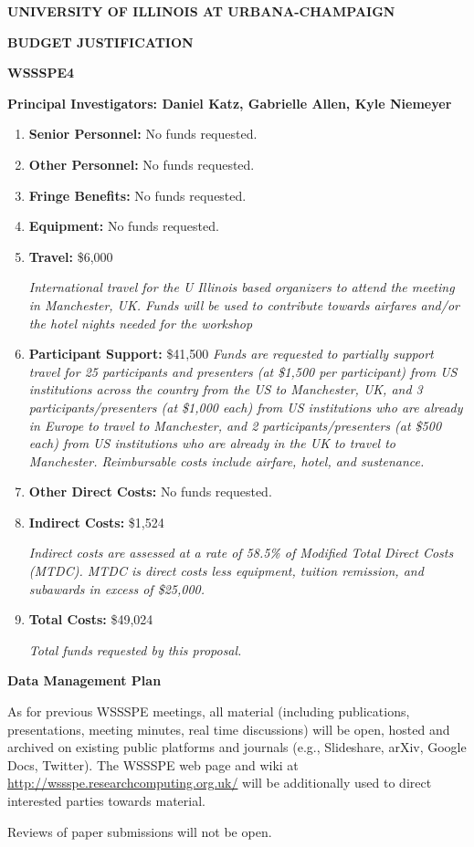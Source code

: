 \documentclass[11pt]{article}
\begin{document}
\newpage




\newpage

{\bf UNIVERSITY OF ILLINOIS AT URBANA-CHAMPAIGN}

{\bf BUDGET JUSTIFICATION}

{\bf WSSSPE4}

{\bf Principal Investigators: Daniel Katz, Gabrielle Allen, Kyle Niemeyer}

\begin{enumerate}[label=\bf \Alph*.,leftmargin=*]

\item {\bf Senior Personnel: } No funds requested.

\item {\bf Other Personnel: } No funds requested.
\item {\bf Fringe Benefits: }  No funds requested. 
\item {\bf Equipment: }  No funds requested. 
\item {\bf Travel: } \$6,000

{\it International travel for the U Illinois based organizers to attend the meeting in Manchester, UK. Funds will be used to contribute towards airfares and/or the hotel nights needed for the workshop}

\item {\bf Participant Support: } \$41,500
{\it Funds are requested to partially support travel for 25 participants and presenters (at \$1,500 per participant) from US institutions across the country from the US to Manchester, UK, and 3 participants/presenters (at \$1,000 each)  from US institutions who are already in Europe to travel to Manchester, and 2 participants/presenters  (at \$500 each)  from US institutions who are already in the UK to travel to Manchester. Reimbursable costs include airfare, hotel, and sustenance.}

\item {\bf Other Direct Costs: } No funds requested. 
\item {\bf Indirect Costs: } \$1,524

{\it Indirect costs are assessed at a rate of 58.5\% of Modified Total Direct Costs (MTDC). MTDC is direct costs less equipment, tuition remission, and subawards in excess of \$25,000. }

\item {\bf Total Costs: } \$49,024

{\it Total funds requested by this proposal. }


\end{enumerate}

\newpage

{\bf Data Management Plan}

As for previous WSSSPE meetings, all material (including publications, presentations, meeting minutes, real time discussions) will be open, hosted and archived on existing public platforms and journals (e.g., Slideshare, arXiv, Google Docs, Twitter). The WSSSPE web page and wiki at \url{http://wssspe.researchcomputing.org.uk/} will be additionally used to direct interested parties towards material.

Reviews of paper submissions will not be open. 
\end{document}

